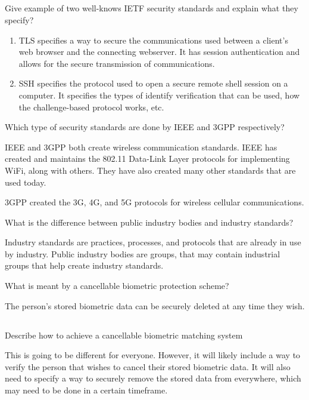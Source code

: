 \begin{questions}
\begin{parts}
  \part{} Give example of two well-knows IETF security standards and explain what they specify?
    \begin{solution}
      \begin{enumerate}[noitemsep]
      \item TLS specifies a way to secure the communications used between a client's web browser and the connecting webserver.
        It has session authentication and allows for the secure transmission of communications.
      \item SSH specifies the protocol used to open a secure remote shell session on a computer.
        It specifies the types of identify verification that can be used, how the challenge-based protocol works, etc.
      \end{enumerate}
    \end{solution}
  \end{parts}

\question{} Which type of security standards are done by IEEE and 3GPP respectively?
  \begin{solution}
    IEEE and 3GPP both create wireless communication standards.
    IEEE has created and maintains the 802.11 Data-Link Layer protocols for implementing WiFi, along with others.
    They have also created many other standards that are used today.

    3GPP created the 3G, 4G, and 5G protocols for wireless cellular communications.
  \end{solution}

\question{} What is the difference between public industry bodies and industry standards?
  \begin{solution}
    Industry standards are practices, processes, and protocols that are already in use by industry.
    Public industry bodies are groups, that may contain industrial groups that help create industry standards.
  \end{solution}

\question{} What is meant by a cancellable biometric protection scheme?
  \begin{solution}
    The person's stored biometric data can be securely deleted at any time they wish.
  \end{solution}

  \begin{parts}
  \part{} Describe how to achieve a cancellable biometric matching system
    \begin{solution}
      This is going to be different for everyone.
      However, it will likely include a way to verify the person that wishes to cancel their stored biometric data.
      It will also need to specify a way to securely remove the stored data from everywhere, which may need to be done in a certain timeframe.
    \end{solution}


\end{parts}
\end{questions}
